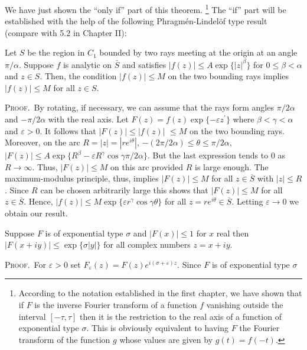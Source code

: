 We have just shown the ``only if'' part of this theorem. \footnote{According to the notation established in the first chapter, we have shown that if $F$ is the inverse Fourier transform of a function $f$ vanishing outside the interval $[-\tau, \tau]$ then it is the restriction to the real axis of a function of exponential type $\sigma$. This is obviously equivalent to having $F$ the Fourier transform of the function $g$ whose values are given by $g(t) = f(-t)$.} The ``if'' part will be established with the help of the following Phragmén-Lindelöf type result (compare with 5.2 in Chapter II):

\begin{lemma}
\label{lem:c3-4-2}
Let $S$ be the region in $C_1$ bounded by two rays meeting at the origin at an angle $\pi/\alpha$. Suppose $f$ is analytic on $\bar{S}$ and satisfies $|f(z)| \leq A \exp \{|z|^{\beta}\}$ for $0 \leq \beta < \alpha$ and $z \in S$. Then, the condition $|f(z)| \leq M$ on the two bounding rays implies $|f(z)| \leq M$ for all $z \in S$.
\end{lemma}

\textsc{Proof.}\ By rotating, if necessary, we can assume that the rays form angles $\pi/2\alpha$ and $-\pi/2\alpha$ with the real axis. Let $F(z) = f(z)\exp\{-\varepsilon z^{\prime}\}$ where $\beta < \gamma < \alpha$ and $\varepsilon > 0$. It follows that $|F(z)| \leq |f(z)|$ $\leq M$ on the two bounding rays. Moreover, on the arc $R = |z| = |re^{i\theta}|$, $-(2\pi/2\alpha) \leq \theta \leq \pi/2\alpha$, $|F(z)| \leq A \exp\{R^{\beta} - \varepsilon R^{\gamma} \cos \gamma\pi/2\alpha\}$. But the last expression tends to 0 as $R \to \infty$. Thus, $|F(z)| \leq M$ on this arc provided $R$ is large enough. The maximum-modulus principle, thus, implies $|F(z)| \leq M$ for all $z \in \overline{S}$ with $|z| \leq R$. Since $R$ can be chosen arbitrarily large this shows that $|F(z)| \leq M$ for all $z \in \overline{S}$. Hence, $|f(z)| \leq M \exp\{\varepsilon r^{\gamma} \cos \gamma\theta\}$ for all $z = re^{i\theta} \in \overline{S}$. Letting $\varepsilon \to 0$ we obtain our result.

\begin{lemma}
\label{lem:c3-4-3}
Suppose $F$ is of exponential type $\sigma$ and $|F(x)| \leq 1$ for $x$ real then $|F(x + iy)| \leq \exp\{\sigma|y|\}$ for all complex numbers $z = x + iy$.
\end{lemma}

\textsc{Proof.}\ For $\varepsilon > 0$ set $F_{\varepsilon}(z) = F(z)e^{i(\sigma + \varepsilon)z}$. Since $F$ is of exponential type $\sigma$

